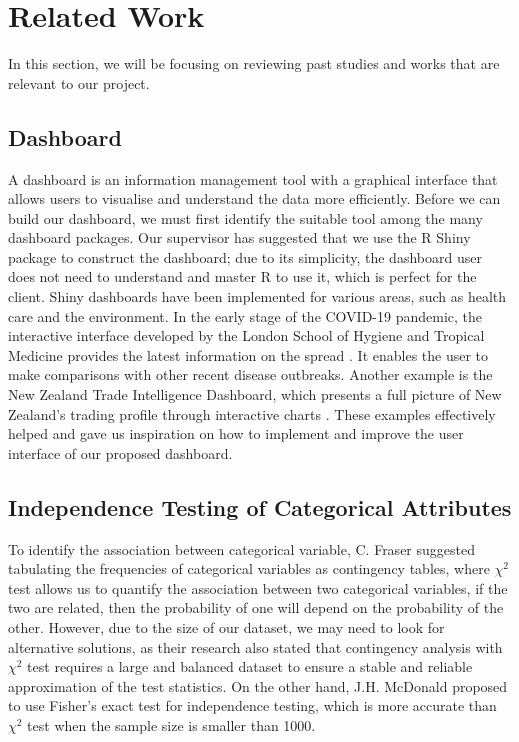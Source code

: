 \documentclass[11pt, oneside]{article}
\begin{document}
\section{Related Work}
In this section, we will be focusing on reviewing past studies and works that are relevant to our project.
\subsection{Dashboard}
A dashboard is an information management tool with a graphical interface that allows users to visualise and understand the data more efficiently. Before we can build our dashboard, we must first identify the suitable tool among the many dashboard packages. Our supervisor has suggested that we use the R Shiny package to construct the dashboard; due to its simplicity, the dashboard user does not need to understand and master R to use it, which is perfect for the client. Shiny dashboards have been implemented for various areas, such as health care and the environment. In the early stage of the COVID-19 pandemic, the interactive interface developed by the London School of Hygiene and Tropical Medicine provides the latest information on the spread \cite{parker_2022}. It enables the user to make comparisons with other recent disease outbreaks. Another example is the New Zealand Trade Intelligence Dashboard, which presents a full picture of New Zealand's trading profile through interactive charts \cite{zhang}. These examples effectively helped and gave us inspiration on how to implement and improve the user interface of our proposed dashboard.

\subsection{Independence Testing of Categorical Attributes}
To identify the association between categorical variable, C. Fraser \cite{Fraser2009} suggested tabulating the frequencies of categorical variables as contingency tables, where $\chi^2$ test allows us to quantify the association between two categorical variables, if the two are related, then the probability of one will depend on the probability of the other. However, due to the size of our dataset, we may need to look for alternative solutions, as their research also stated that contingency analysis with $\chi^2$ test requires a large and balanced dataset to ensure a stable and reliable approximation of the test statistics. On the other hand, J.H. McDonald \cite{mcdonald} proposed to use Fisher's exact test for independence testing, which is more accurate than $\chi^2$ test when the sample size is smaller than 1000. 
\end{document}
